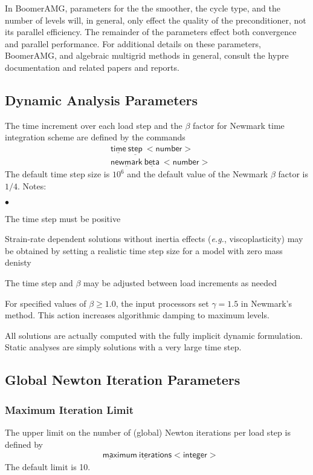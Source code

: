 \documentclass[11pt]{report}
\numberwithin{equation}{section}
\newcommand{\nin} {\noindent}
\newcommand{\ul} {\underline}
\newcommand{\hv} {\mathsf}   %
\newcommand{\eg}{\emph{e.g.},\xspace}
\newcommand{\squishlist}{
 \begin{list}{$\bullet$}
  { \setlength{\itemsep}{0pt}
     \setlength{\parsep}{3pt}
     \setlength{\topsep}{3pt}
     \setlength{\partopsep}{0pt}
     \setlength{\leftmargin}{1.5em}
     \setlength{\labelwidth}{1em}
     \setlength{\labelsep}{0.5em} } }
\newcommand{\squishend}{
  \end{list}  }
\begin{document}
In BoomerAMG, parameters for the the smoother, the cycle type, and the number of levels will, in general, only effect the
quality of the preconditioner, not its parallel efficiency.  The remainder of the parameters effect both convergence
and parallel performance.  For additional details on these parameters, BoomerAMG, and algebraic multigrid methods 
in general, consult the hypre documentation and related papers and reports.



\subsection{Dynamic Analysis Parameters}
\nin
The time increment over each load step and the $\beta$ factor 
for Newmark time integration scheme are defined by the commands
\begin{align*}
&\hv{\ul{time}\ \ul{step}\ <number>} \\
&\hv{\ul{newmark}\ \ul{beta}\ <number>} 
\end{align*}
The default time step size is $10^6$ and the default value of the Newmark $\beta$ 
factor is $1/4$. Notes:
\squishlist
\item
The time step must be positive
\item
Strain-rate dependent solutions without inertia effects (\eg viscoplasticity) may 
be obtained by setting a realistic time step size for a model with zero mass denisty
\item
The time step and $\beta$ may be adjusted between load increments as needed
\item For specified values of $\beta \ge 1.0$, the input processors set $\gamma=1.5$ in 
Newmark's method. This action increases algorithmic damping to maximum levels.
\item
All solutions are actually computed with the fully implicit dynamic 
formulation. Static analyses are simply solutions with a very large time step.
\squishend

\subsection{Global Newton Iteration Parameters}

\subsubsection{Maximum Iteration Limit}
\nin The upper limit on the number of (global) Newton iterations per load
step is defined by
\begin{align*}
&\hv{\ul{max}imum\  \ul{iter}ations <integer> }
\end{align*}
The default limit is 10.
\end{document}
